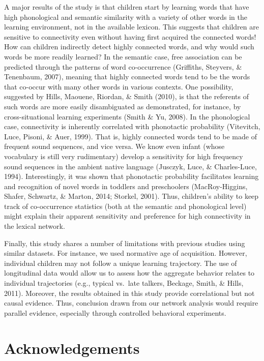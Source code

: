\documentclass[10pt, letterpaper]{article}
\begin{document}
A major results of the study is that children start by learning words
that have high phonological and semantic similarity with a variety of
other words in the learning environment, not in the available lexicon.
This suggests that children are sensitive to connectivity even without
having first acquired the connected words! How can children indirectly
detect highly connected words, and why would such words be more readily
learned? In the semantic case, free association can be predicted through
the patterns of word co-occurrence (Griffiths, Steyvers, \& Tenenbaum,
2007), meaning that highly connected words tend to be the words that
co-occur with many other words in various contexts. One possibility,
suggested by Hills, Maouene, Riordan, \& Smith (2010), is that the
referents of such words are more easily disambiguated as demonstrated,
for instance, by cross-situational learning experiments (Smith \& Yu,
2008). In the phonological case, connectivity is inherently correlated
with phonotactic probability (Vitevitch, Luce, Pisoni, \& Auer, 1999).
That is, highly connected words tend to be made of frequent sound
sequences, and vice versa. We know even infant (whose vocabulary is
still very rudimentary) develop a sensitivity for high frequency sound
sequences in the ambient native language (Jusczyk, Luce, \&
Charles-Luce, 1994). Interestingly, it was shown that phonotactic
probability facilitates learning and recognition of novel words in
toddlers and preschoolers (MacRoy-Higgins, Shafer, Schwartz, \& Marton,
2014; Storkel, 2001). Thus, children's ability to keep track of
co-occurrence statistics (both at the semantic and phonological level)
might explain their apparent sensitivity and preference for high
connectivity in the lexical network.

Finally, this study shares a number of limitations with previous studies
using similar datasets. For instance, we used normative age of
acquisition. However, individual children may not follow a unique
learning trajectory. The use of longitudinal data would allow us to
assess how the aggregate behavior relates to individual trajectories
(e.g., typical vs.~late talkers, Beckage, Smith, \& Hills, 2011).
Moreover, the results obtained in this study provide correlational but
not causal evidence. Thus, conclusion drawn from our network analysis
would require parallel evidence, especially through controlled
behavioral experiments.

\section{Acknowledgements}\label{acknowledgements}
\end{document}

